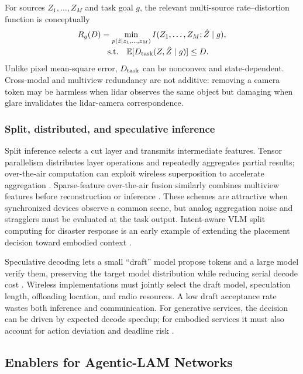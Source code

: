 \documentclass[letterpaper,journal]{IEEEtran}
\begin{document}
For sources $Z_1,\ldots,Z_M$ and task goal $g$, the relevant multi-source
rate--distortion function is conceptually
\begin{equation}
\begin{split}
R_g(D)&=\min_{p(\hat z|z_1,\ldots,z_M)}
I(Z_1,\ldots,Z_M;\hat Z\mid g),\\[-2pt]
&\hspace{8pt}\text{s.t.}\quad
\mathbb{E}[D_{\rm task}(Z,\hat Z\mid g)]\le D.
\end{split}
\label{eq:rd}
\end{equation}
Unlike pixel mean-square error, $D_{\rm task}$ can be nonconvex and
state-dependent. Cross-modal and multiview redundancy are not additive:
removing a camera token may be harmless when lidar observes the same object
but damaging when glare invalidates the lidar-camera correspondence.

\subsubsection{Split, distributed, and speculative inference}
Split inference selects a cut layer and transmits intermediate features.
Tensor parallelism distributes layer operations and repeatedly aggregates
partial results; over-the-air computation can exploit wireless superposition
to accelerate aggregation \cite{distributedllm,aircompneural}. Sparse-feature
over-the-air fusion similarly combines multiview features before
reconstruction or inference \cite{airfusion}. These schemes are attractive
when synchronized devices observe a common scene, but analog aggregation
noise and stragglers must be evaluated at the task output. Intent-aware VLM
split computing for disaster response is an early example of extending the
placement decision toward embodied context \cite{avery}.

Speculative decoding lets a small ``draft'' model propose tokens and a large
model verify them, preserving the target model distribution while reducing
serial decode cost \cite{specdecode}. Wireless implementations must jointly
select the draft model, speculation length, offloading location, and radio
resources. A low draft acceptance rate wastes both inference and
communication. For generative services, the decision can be driven by
expected decode speedup; for embodied services it must also account for action
deviation and deadline risk \cite{actiondeviation}.

\subsection{Enablers for Agentic-LAM Networks}
\end{document}
